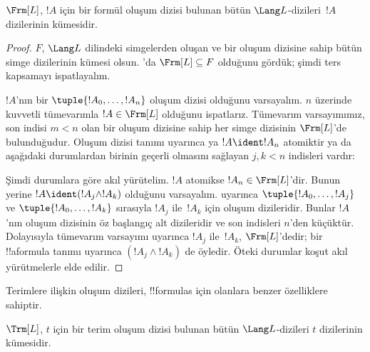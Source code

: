 \begin{thm}
$\Frm[L]$, $!A$ için bir formül oluşum dizisi bulunan bütün $\Lang
L$-dizileri~$!A$ dizilerinin kümesidir.
\end{thm}

\begin{proof}
$F$, $\Lang L$ dilindeki simgelerden oluşan ve bir oluşum dizisine sahip
bütün simge dizilerinin kümesi olsun. 'da
$\Frm[L] \subseteq F$ olduğunu gördük; şimdi ters kapsamayı ispatlayalım.

$!A$'nın bir $\tuple{!A_0,\dotsc,!A_n}$ oluşum dizisi olduğunu
varsayalım. $n$ üzerinde kuvvetli tümevarımla $!A \in \Frm[L]$ olduğunu
ispatlarız. Tümevarım varsayımımız, son indisi $m < n$ olan bir oluşum
dizisine sahip her simge dizisinin $\Frm[L]$'de bulunduğudur. Oluşum
dizisi tanımı uyarınca ya $!A \ident !A_n$ atomiktir ya da aşağıdaki
durumlardan birinin geçerli olmasını sağlayan $j,k < n$ indisleri vardır:
\begin{enumerate}
\end{enumerate}
Şimdi durumlara göre akıl yürütelim. $!A$ atomikse
$!A_n \in \Frm[L]$'dir. Bunun yerine
$!A \ident (!A_j \land !A_k)$ olduğunu varsayalım.
 uyarınca
$\tuple{!A_0,\dotsc,!A_j}$ ve $\tuple{!A_0,\dotsc,!A_k}$ sırasıyla
$!A_j$ ile~$!A_k$ için oluşum dizileridir. Bunlar $!A$'nın oluşum
dizisinin öz başlangıç alt dizileridir ve son indisleri $n$'den küçüktür.
Dolayısıyla tümevarım varsayımı uyarınca $!A_j$ ile~$!A_k$,
$\Frm[L]$'dedir; bir !!a{formula} tanımı uyarınca
$(!A_j \land !A_k)$ de öyledir. Öteki durumlar koşut akıl yürütmelerle
elde edilir.
\end{proof}

Terimlere ilişkin oluşum dizileri, !!{formula}s için olanlara benzer
özelliklere sahiptir.

\begin{prop}
$\Trm[L]$, $t$ için bir terim oluşum dizisi bulunan bütün $\Lang L$-dizileri
$t$ dizilerinin kümesidir.
\end{prop}

